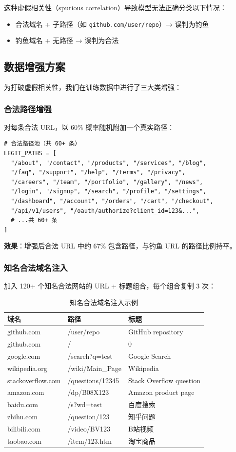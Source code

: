 \documentclass[11pt,a4paper]{article}
\begin{document}
这种虚假相关性（spurious correlation）导致模型无法正确分类以下情况：
\begin{itemize}
  \item 合法域名 + 子路径（如 \texttt{github.com/user/repo}）→ 误判为钓鱼
  \item 钓鱼域名 + 无路径 → 误判为合法
\end{itemize}

\subsection{数据增强方案}

为打破虚假相关性，我们在训练数据中进行了三大类增强：

\subsubsection{合法路径增强}

对每条合法 URL，以 60\% 概率随机附加一个真实路径：

\begin{Verbatim}[frame=single,fontsize=\small]
# 合法路径池（共 60+ 条）
LEGIT_PATHS = [
  "/about", "/contact", "/products", "/services", "/blog",
  "/faq", "/support", "/help", "/terms", "/privacy",
  "/careers", "/team", "/portfolio", "/gallery", "/news",
  "/login", "/signup", "/search", "/profile", "/settings",
  "/dashboard", "/account", "/orders", "/cart", "/checkout",
  "/api/v1/users", "/oauth/authorize?client_id=123&...",
  # ...共 60+ 条
]
\end{Verbatim}

\textbf{效果}：增强后合法 URL 中约 67\% 包含路径，与钓鱼 URL 的路径比例持平。

\subsubsection{知名合法域名注入}

加入 120+ 个知名合法网站的 URL + 标题组合，每个组合复制 3 次：

\begin{table}[h]
\centering
\caption{知名合法域名注入示例}
\begin{tabular}{lll}
\toprule
域名 & 路径 & 标题 \\
\midrule
github.com & /user/repo & GitHub repository \\
github.com & / & 0 \\
google.com & /search?q=test & Google Search \\
wikipedia.org & /wiki/Main\_Page & Wikipedia \\
stackoverflow.com & /questions/12345 & Stack Overflow question \\
amazon.com & /dp/B08X123 & Amazon product page \\
baidu.com & /s?wd=test & 百度搜索 \\
zhihu.com & /question/123 & 知乎问题 \\
bilibili.com & /video/BV123 & B站视频 \\
taobao.com & /item/123.htm & 淘宝商品 \\
\bottomrule
\end{tabular}
\end{table}
\end{document}
